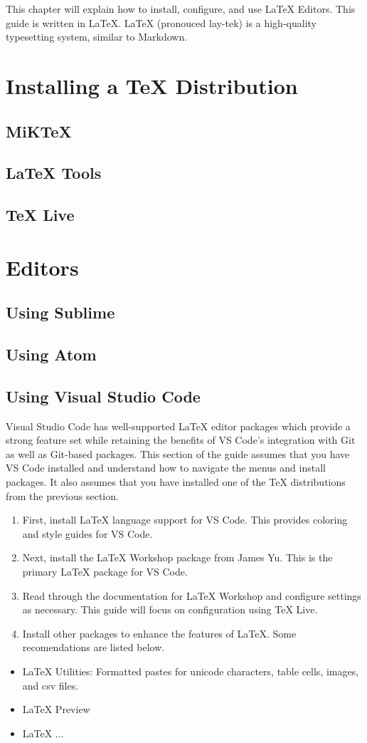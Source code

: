 This chapter will explain how to install, configure, and use LaTeX Editors. This guide is written in LaTeX. LaTeX (pronouced lay-tek) is a high-quality typesetting system, similar to Markdown. 
\section{Installing a TeX Distribution}
	\subsection{MiKTeX}
	\subsection{LaTeX Tools}
	\subsection{TeX Live}
\section{Editors}
	\subsection{Using Sublime}
	\subsection{Using Atom}
	\subsection{Using Visual Studio Code}
		Visual Studio Code has well-supported LaTeX editor packages which provide a strong feature set while retaining the benefits of VS Code's integration with Git as well as Git-based packages. This section of the guide assumes that you have VS Code installed and understand how to navigate the menus and install packages. It also assumes that you have installed one of the TeX distributions from the previous section.
		\begin{enumerate}
			\item First, install LaTeX language support for VS Code. This provides coloring and style guides for VS Code.
			\item Next, install the LaTeX Workshop package from James Yu. This is the primary LaTeX package for VS Code.
			\item Read through the documentation for LaTeX Workshop and configure settings as necessary. This guide will focus on configuration using TeX Live.
			\item Install other packages to enhance the features of LaTeX. Some recomendations are listed below.
		\end{enumerate}
		\begin{itemize}
			\item LaTeX Utilities: Formatted pastes for unicode characters, table cells, images, and csv files.
			\item LaTeX Preview
			\item LaTeX ...
		\end{itemize}
	
